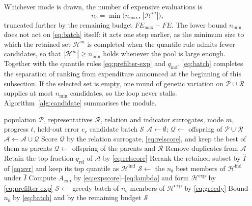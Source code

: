 \documentclass[final,5p,times,twocolumn]{elsarticle}
\begin{document}
Whichever mode is drawn, the number of expensive evaluations is
\begin{equation}
n_b=\min\bigl(n_{\max},\,|\mathcal{H}^{m}|\bigr),
\label{eq:batch}
\end{equation}
truncated further by the remaining budget $FE_{\max}-FE$. The lower bound
$n_{\min}$ does not act on \eqref{eq:batch} itself: it acts one step earlier, as
the minimum size to which the retained set $\mathcal{H}^{m}$ is completed when
the quantile rule admits fewer candidates, so that $|\mathcal{H}^{m}|\geq
n_{\min}$ holds whenever the pool is large enough. Together with the quantile
rules \eqref{eq:prefilter-exp} and $q_{\mathrm{ind}}$, \eqref{eq:batch}
completes the separation of ranking from expenditure announced at the beginning
of this subsection. If the selected set is empty, one round of
genetic variation on $\mathcal{P}\cup\mathcal{R}$ supplies at most $n_{\min}$
candidates, so the loop never stalls. Algorithm~\ref{alg:candidate} summarises
the module.

\begin{algorithm}[t]
\caption{Dual-mode candidate selection}
\label{alg:candidate}
\begin{algorithmic}[1]
\Require population $\mathcal{P}$, representatives $\mathcal{R}$, relation and
         indicator surrogates, mode $m$, progress $t$, held-out error $e_r$
\Ensure candidate batch $\mathcal{S}$
\State $\mathcal{A}\gets\emptyset$;
       $\mathcal{Q}\gets$ offspring of $\mathcal{P}\cup\mathcal{R}$
  \State $\mathcal{A}\gets\mathcal{A}\cup\mathcal{Q}$
  \State Score $\mathcal{Q}$ by the relation surrogate, \eqref{eq:relscore},
         and keep the best of them as parents
  \State $\mathcal{Q}\gets$ offspring of the parents and $\mathcal{R}$
\EndWhile
\State Remove duplicates from $\mathcal{A}$
  \State Retain the top fraction $q_{\mathrm{rel}}$ of $\mathcal{A}$ by
         \eqref{eq:relscore}
  \State Rerank the retained subset by $\widehat I$ of \eqref{eq:svr} and keep
         its top quantile as $\mathcal{H}^{\mathrm{ind}}$
  \State $\mathcal{S}\gets$ the $n_b$ best members of
         $\mathcal{H}^{\mathrm{ind}}$ under $\widehat I$
\Else
  \State Compute $A_{\mathrm{exp}}$ by \eqref{eq:expscore}--\eqref{eq:lambda}
         and form $\mathcal{H}^{\mathrm{exp}}$ by \eqref{eq:prefilter-exp}
  \State $\mathcal{S}\gets$ greedy batch of $n_b$ members of
         $\mathcal{H}^{\mathrm{exp}}$ by \eqref{eq:greedy}
\EndIf
\State Bound $n_b$ by \eqref{eq:batch} and by the remaining budget
\State \Return $\mathcal{S}$
\end{algorithmic}
\end{algorithm}
\end{document}
